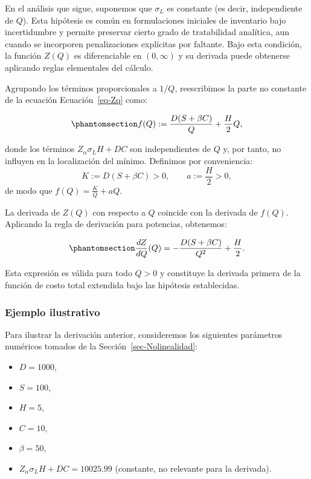 \documentclass[
  spanish,
  us-letterpaper,
]{scrreprt}
\providecommand{\tightlist}{%
  \setlength{\itemsep}{0pt}\setlength{\parskip}{0pt}}
\numberwithin{equation}{section}
\begin{document}
En el análisis que sigue, suponemos que \(\sigma_L\) es constante (es
decir, independiente de \(Q\)). Esta hipótesis es común en formulaciones
iniciales de inventario bajo incertidumbre y permite preservar cierto
grado de tratabilidad analítica, aun cuando se incorporen penalizaciones
explícitas por faltante. Bajo esta condición, la función \(Z(Q)\) es
diferenciable en \((0, \infty)\) y su derivada puede obtenerse aplicando
reglas elementales del cálculo.

Agrupando los términos proporcionales a \(1/Q\), reescribimos la parte
no constante de la ecuación Ecuación~\ref{eq-Zq} como:

\begin{equation}\phantomsection\label{eq-fQ_no_constante}{
f(Q) := \frac{D(S + \beta C)}{Q} + \frac{H}{2} Q,
}\end{equation}

donde los términos \(Z_\alpha \sigma_L H + D C\) son independientes de
\(Q\) y, por tanto, no influyen en la localización del mínimo. Definimos
por conveniencia: \[
K := D(S + \beta C) > 0, \qquad a := \frac{H}{2} > 0,
\] de modo que \(f(Q) = \frac{K}{Q} + a Q\).

La derivada de \(Z(Q)\) con respecto a \(Q\) coincide con la derivada de
\(f(Q)\). Aplicando la regla de derivación para potencias, obtenemos:

\begin{equation}\phantomsection\label{eq-dZ_dQ}{
\frac{dZ}{dQ}(Q) = -\frac{D(S + \beta C)}{Q^2} + \frac{H}{2}.
}\end{equation}

Esta expresión es válida para todo \(Q > 0\) y constituye la derivada
primera de la función de costo total extendida bajo las hipótesis
establecidas.

\subsubsection{Ejemplo ilustrativo}\label{ejemplo-ilustrativo-4}

Para ilustrar la derivación anterior, consideremos los siguientes
parámetros numéricos tomados de la Sección~\ref{sec-Nolinealidad}:

\begin{itemize}
\tightlist
\item
  \(D = 1000\),
\item
  \(S = 100\),
\item
  \(H = 5\),
\item
  \(C = 10\),
\item
  \(\beta = 50\),
\item
  \(Z_\alpha \sigma_L H + D C = 10025.99\) (constante, no relevante para
  la derivada).
\end{itemize}
\end{document}
